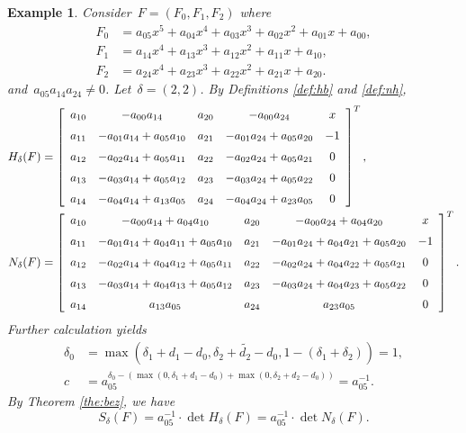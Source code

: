 \documentclass{article}
\newtheorem{example}[theorem]{Example}
\begin{document}
\begin{example}
Consider~$F= ({F_0},{F_1},{F_2})$ where
\begin{align*}
  F_0 &=  {{a_{05}}{x^5}+{a_{04}}{x^4} + a_{03}}{x^3} + {a_{02}}{x^2} + {a_{01}}x + {a_{00}},\\
  F_1 &=  {{a_{14}}{x^4} + a_{13}}{x^3} + {a_{12}}{x^2} + {a_{11}}x + {a_{10}},\\
  F_2 &= {{a_{24}}{x^4} + a_{23}}{x^3} + {a_{22}}{x^2} + {a_{21}}x + {a_{20}}.
\end{align*}
and~$a_{05}a_{14}a_{24}\ne0$. Let~$\delta=(2,2)$. By Definitions
\ref{def:hb} and \ref{def:nh},
\begin{align*}
{H}_\delta(F)&= \left[ \begin {array}{ccccc} a_{{10}}&-a_{{00}}a_{{14}}&a_{{20}}&
-a_{{00}}a_{{24}}&x\\ \noalign{\medskip}a_{{11}}&-a_{{01}}a_{{14}
}+a_{{05}}a_{{10}}&a_{{21}}&-a_{{01}}a_{{24}}+a_{{05}}a_{{20}}&
-1\\ \noalign{\medskip}a_{{12}}&-a_{{02}}a_{{14}}+a_{{05}}a_{{11}
}&a_{{22}}&-a_{{02}}a_{{24}}+a_{{05}}a_{{21}}&0
\\ \noalign{\medskip}a_{{13}}&-a_{{03}}a_{{14}}+a_{{05}}a_{{12}}&
a_{{23}}&-a_{{03}}a_{{24}}+a_{{05}}a_{{22}}&0
\\ \noalign{\medskip}a_{{14}}&-a_{{04}}a_{{14}}+a_{{13}}a_{{05}}&
a_{{24}}&-a_{{04}}a_{{24}}+a_{{23}}a_{{05}}&0\end {array}
 \right]^T,\\
{N}_\delta(F)&=\left[ \begin {array}{ccccc} a_{{10}}&-a_{{00}}a_{{14}}+a_{{04}}a
_{{10}}&a_{{20}}&-a_{{00}}a_{{24}}+a_{{04}}a_{{20}}&x
\\ \noalign{\medskip}a_{{11}}&-a_{{01}}a_{{14}}+a_{{04}}a_{{11}}+
a_{{05}}a_{{10}}&a_{{21}}&-a_{{01}}a_{{24}}+a_{{04}}a_{{21}}+a_
{{05}}a_{{20}}&-1\\ \noalign{\medskip}a_{{12}}&-a_{{02}}a_{{14}}+
a_{{04}}a_{{12}}+a_{{05}}a_{{11}}&a_{{22}}&-a_{{02}}a_{{24}}+a_
{{04}}a_{{22}}+a_{{05}}a_{{21}}&0\\ \noalign{\medskip}a_{{13}}&-a
_{{03}}a_{{14}}+a_{{04}}a_{{13}}+a_{{05}}a_{{12}}&a_{{23}}&-a_{
{03}}a_{{24}}+a_{{04}}a_{{23}}+a_{{05}}a_{{22}}&0
\\ \noalign{\medskip}a_{{14}}&a_{{13}}a_{{05}}&a_{{24}}&a_{{23}}a
_{{05}}&0\end {array} \right]^T.
\end{align*}
Further calculation yields
\begin{align*}
\delta_0&=\max(\delta_1+d_1-d_0,\tilde{\delta_2+d_2-d_0}, 1-(\delta_1+\delta_2))=1,\\
c &={a_{05}^{\delta_0-(\max(0,\delta_1+d_1-d_0)+\max(0,\delta_2+d_2-d_0))}}={a_{05}^{-1}}.
\end{align*}
By Theorem \ref{the:bez}, we have
\[
{S_\delta }(F) = {a_{05}^{-1}} \cdot \det {H}_\delta(F)={a_{05}^{-1}}\cdot \det{N}_\delta(F).\]


\end{example}
\end{document}

